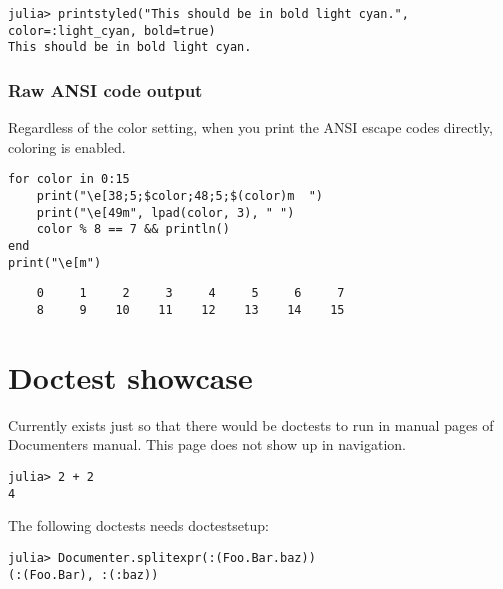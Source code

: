 \begin{verbatim}
julia> printstyled("This should be in bold light cyan.", color=:light_cyan, bold=true)
This should be in bold light cyan.
\end{verbatim}



\subsubsection{Raw ANSI code output}



\label{13267379516757075300}{}


Regardless of the color setting, when you print the ANSI escape codes directly, coloring is enabled.




\begin{verbatim}
for color in 0:15
    print("\e[38;5;$color;48;5;$(color)m  ")
    print("\e[49m", lpad(color, 3), " ")
    color % 8 == 7 && println()
end
print("\e[m")
\end{verbatim}


\begin{verbatim}
    0     1     2     3     4     5     6     7
    8     9    10    11    12    13    14    15

\end{verbatim}



\section{Doctest showcase}



\label{2602340166667619136}{}


Currently exists just so that there would be doctests to run in manual pages of Documenter{\textquotesingle}s manual. This page does not show up in navigation.




\begin{verbatim}
julia> 2 + 2
4
\end{verbatim}



The following doctests needs doctestsetup:




\begin{verbatim}
julia> Documenter.splitexpr(:(Foo.Bar.baz))
(:(Foo.Bar), :(:baz))
\end{verbatim}



